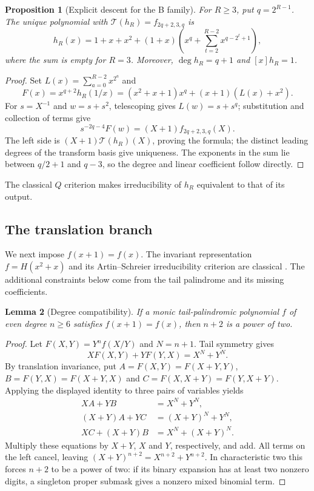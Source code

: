\documentclass[11pt]{article}
\newtheorem{proposition}{Proposition}[section]
\newtheorem{lemma}[proposition]{Lemma}
\theoremstyle{definition}
\theoremstyle{remark}
\begin{document}
\begin{proposition}[Explicit descent for the B family]\label{prop:B-descent}
For $R\ge3$, put $q=2^{R-1}$. The unique polynomial with
$\mathcal T(h_R)=f_{2q+2,3,q}$ is
\begin{equation}\label{eq:B-descent}
 h_R(x)=1+x+x^2+(1+x)\left(x^q+
       \sum_{t=2}^{R-2}x^{q-2^t+1}\right),
\end{equation}
where the sum is empty for $R=3$. Moreover, $\deg h_R=q+1$ and
$[x]h_R=1$.
\end{proposition}
\begin{proof}
Set $L(x)=\sum_{a=0}^{R-2}x^{2^a}$ and
\[
 F(x)=x^{q+2}h_R(1/x)
     =(x^2+x+1)x^q+(x+1)(L(x)+x^2).
\]
For $s=X^{-1}$ and $w=s+s^2$, telescoping gives $L(w)=s+s^q$;
substitution and collection of terms give
\[
 s^{-2q-4}F(w)=(X+1)f_{2q+2,3,q}(X).
\]
The left side is $(X+1)\mathcal T(h_R)(X)$, proving the formula;
the distinct leading degrees of the transform basis give uniqueness.
The exponents in the sum lie between $q/2+1$ and $q-3$, so the
degree and linear coefficient follow directly.
\end{proof}
The classical $Q$ criterion makes irreducibility of $h_R$ equivalent
to that of its output.

\subsection{The translation branch}\label{sec:translation}
We next impose $f(x+1)=f(x)$. The invariant representation
$f=H(x^2+x)$ and its Artin--Schreier irreducibility criterion are
classical \cite[Lemma 2.1 and Theorem 2.2]{Kap17}. The additional
constraints below come from the tail palindrome and its missing
coefficients.

\begin{lemma}[Degree compatibility]\label{lem:translation-degree}
If a monic tail-palindromic polynomial $f$ of even degree $n\ge6$
satisfies $f(x+1)=f(x)$, then $n+2$ is a power of two.
\end{lemma}
\begin{proof}
Let $F(X,Y)=Y^nf(X/Y)$ and $N=n+1$. Tail symmetry gives
\[
 XF(X,Y)+YF(Y,X)=X^N+Y^N.
\]
By translation invariance, put
$A=F(X,Y)=F(X+Y,Y)$, $B=F(Y,X)=F(X+Y,X)$ and
$C=F(X,X+Y)=F(Y,X+Y)$. Applying the displayed identity to
three pairs of variables yields
\[
\begin{aligned}
 XA+YB&=X^N+Y^N,\\
 (X+Y)A+YC&=(X+Y)^N+Y^N,\\
 XC+(X+Y)B&=X^N+(X+Y)^N.
\end{aligned}
\]
Multiply these equations by $X+Y$, $X$ and $Y$, respectively,
and add. All terms on the left cancel, leaving
$(X+Y)^{n+2}=X^{n+2}+Y^{n+2}$. In characteristic two this
forces $n+2$ to be a power of two: if its binary expansion has
at least two nonzero digits, a singleton proper submask gives
a nonzero mixed binomial term.
\end{proof}
\end{document}
